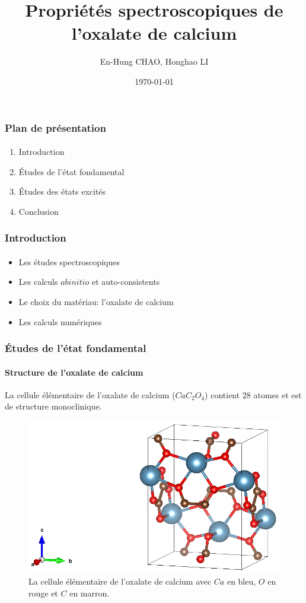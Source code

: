 \documentclass[a4paper, 12pt, twoside, titlepage, french]{beamer}
\title{Propriétés spectroscopiques de l'oxalate de calcium}
\author{En-Hung CHAO, Honghao LI}
\institute{École Polytechnique}
\date{\today}
\begin{document}
\begin{frame}
\titlepage
\end{frame}
\begin{frame}
\frametitle{Plan de présentation}
\framesubtitle{}
\begin{enumerate}
\item Introduction
\item Études de l'état fondamental
\item Études des états excités
\item Conclusion 
\end{enumerate}
\end{frame}

\begin{frame}
\frametitle{Introduction}
\framesubtitle{}
\begin{itemize}
\item Les études spectroscopiques
\item Les calculs $ab initio$ et auto-consistents
\item Le choix du matériau: l'oxalate de calcium
\item Les calculs numériques
\end{itemize}
\end{frame}
\newpage

\begin{frame}
\frametitle{Études de l'état fondamental}
\framesubtitle{Structure de l'oxalate de calcium}
La cellule élémentaire de l'oxalate de calcium ($CaC_2O_4$) contient 28 atomes et est de structure monoclinique.
\begin{figure}[!h]
  \centering
  \includegraphics[height=0.4\textheight]{co_structure}
  \caption{La cellule élémentaire de l'oxalate de calcium avec $Ca$ en bleu, $O$ en rouge et $C$ en marron.}\label{BrillouinZone}
\end{figure}
\end{frame}
\newpage
\end{document}
